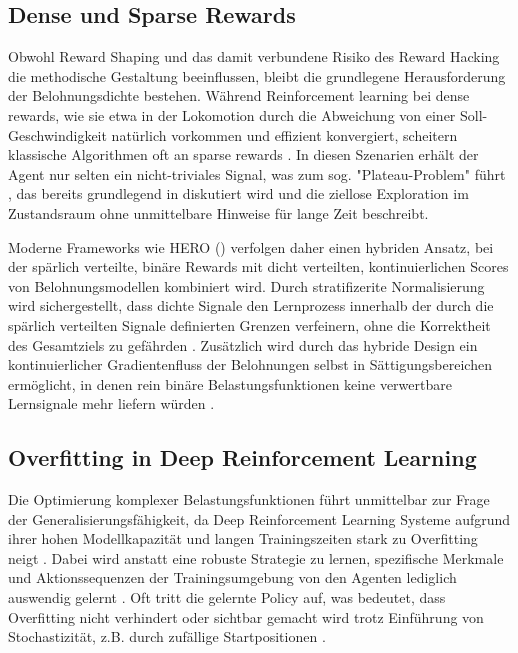 \subsection{Dense und Sparse Rewards}
Obwohl Reward Shaping und das damit verbundene Risiko des Reward Hacking die methodische Gestaltung beeinflussen, bleibt die grundlegene Herausforderung der Belohnungsdichte bestehen. Während Reinforcement learning bei dense rewards, wie sie etwa in der Lokomotion durch die Abweichung von einer Soll-Geschwindigkeit natürlich vorkommen und effizient konvergiert, scheitern klassische Algorithmen oft an sparse rewards  \cite{burda2018explorationrandomnetworkdistillation, tangDeepReinforcementLearning2024}. \newline
In diesen Szenarien erhält der Agent nur selten ein nicht-triviales Signal, was zum sog. "Plateau-Problem" führt \cite{burda2018explorationrandomnetworkdistillation}, das bereits grundlegend in \cite{sutton2018reinforcement} diskutiert wird und die ziellose Exploration im Zustandsraum ohne unmittelbare Hinweise für lange Zeit beschreibt. 

Moderne Frameworks wie HERO (\cite{taoHybridReinforcementWhen2025}) verfolgen daher einen hybriden Ansatz, bei der spärlich verteilte, binäre Rewards mit dicht verteilten, kontinuierlichen Scores von Belohnungsmodellen kombiniert wird. Durch stratifizerite Normalisierung wird sichergestellt, dass dichte Signale den Lernprozess innerhalb der durch die spärlich verteilten Signale definierten Grenzen verfeinern, ohne die Korrektheit des Gesamtziels zu gefährden \cite{taoHybridReinforcementWhen2025}. Zusätzlich wird durch das hybride Design ein kontinuierlicher Gradientenfluss der Belohnungen selbst in Sättigungsbereichen ermöglicht, in denen rein binäre Belastungsfunktionen keine verwertbare Lernsignale mehr liefern würden \cite{taoHybridReinforcementWhen2025}.

\subsection{Overfitting in Deep Reinforcement Learning}
Die Optimierung komplexer Belastungsfunktionen führt unmittelbar zur Frage der Generalisierungsfähigkeit, da Deep Reinforcement Learning Systeme aufgrund ihrer hohen Modellkapazität und langen Trainingszeiten stark zu Overfitting neigt \cite{zhang2018studyoverfittingdeepreinforcement}. Dabei wird anstatt eine robuste Strategie zu lernen, spezifische Merkmale und Aktionssequenzen der Trainingsumgebung von den Agenten lediglich auswendig gelernt \cite{zhang2018studyoverfittingdeepreinforcement, sutton2018reinforcement}. Oft tritt die gelernte Policy  auf, was bedeutet, dass Overfitting nicht verhindert oder sichtbar gemacht wird trotz Einführung von Stochastizität, z.B. durch zufällige Startpositionen \cite{zhang2018studyoverfittingdeepreinforcement}.

